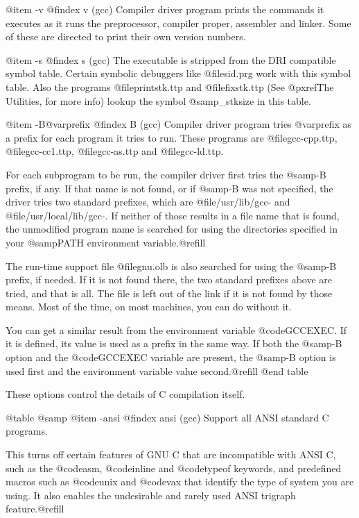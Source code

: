 {@item -v
@findex v (gcc)
Compiler driver program prints the commands it executes as it runs
the preprocessor, compiler proper, assembler and linker. Some of
these are directed to print their own version numbers.

@item -s
@findex s (gcc)
The executable is stripped from the DRI compatible symbol table.
Certain symbolic debuggers like @file{sid.prg} work with this symbol
table. Also the programs @file{printstk.ttp} and @file{fixstk.ttp} (See
@pxref{The Utilities}, for more info) lookup the symbol @samp{_stksize}
in this table.

@item -B@var{prefix}
@findex B (gcc)
Compiler driver program tries @var{prefix} as a prefix for each
program it tries to run. These programs are @file{gcc-cpp.ttp},
@file{gcc-cc1.ttp}, @file{gcc-as.ttp} and @file{gcc-ld.ttp}.

For each subprogram to be run, the compiler driver first tries the
@samp{-B} prefix, if any. If that name is not found, or if @samp{-B}
was not specified, the driver tries two standard prefixes, which are
@file{/usr/lib/gcc-} and @file{/usr/local/lib/gcc-}. If neither of
those results in a file name that is found, the unmodified program
name is searched for using the directories specified in your
@samp{PATH} environment variable.@refill

The run-time support file @file{gnu.olb} is also searched for using
the @samp{-B} prefix, if needed.  If it is not found there, the two
standard prefixes above are tried, and that is all. The file is left
out of the link if it is not found by those means.  Most of the time,
on most machines, you can do without it.

You can get a similar result from the environment variable
@code{GCCEXEC}. If it is defined, its value is used as a prefix
in the same way. If both the @samp{-B} option and the
@code{GCCEXEC} variable are present, the @samp{-B} option is
used first and the environment variable value second.@refill
@end table

These options control the details of C compilation itself.

@table @samp
@item -ansi
@findex ansi (gcc)
Support all ANSI standard C programs.

This turns off certain features of GNU C that are incompatible with
ANSI C, such as the @code{asm}, @code{inline} and @code{typeof}
keywords, and predefined macros such as @code{unix} and @code{vax}
that identify the type of system you are using. It also enables the
undesirable and rarely used ANSI trigraph feature.@refill

}

